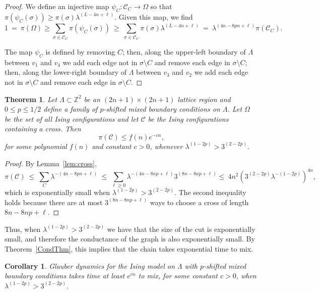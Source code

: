 \documentclass[letterpaper,english,numberwithinsect]{amsart}
\newtheorem{theorem}{Theorem}
\newtheorem{corollary}{Corollary}[section]
\newcommand{\cC}{\mathcal{C}}
\begin{document}
\begin{proof}  
We define an injective map $\psi_C: \cC_C \rightarrow \Omega$ so that
$\pi(\psi_C(\sigma)) \geq \pi(\sigma) \lambda^{(L-4n+\ell)}$.
Given this  map, we find
$$
1 \ =\ \pi(\Omega)  \geq  \sum_{\sigma\in\cC_C } \pi(\psi_C(\sigma))
\ \geq \  \sum_{\sigma\in\cC_C } \pi(\sigma) \lambda^{(L-4n +\ell)} 
\ = \ \lambda^{(4n-8pn+\ell)} \pi(\cC_C ).
$$

\noindent The map $\psi_C$ is defined by removing $C$; 
then, along the upper-left boundary of $\Lambda$ between $v_1$ and $v_4$ we add each edge not in $\sigma \setminus C$ and remove each edge in $\sigma \setminus C$; then, along the lower-right boundary of $\Lambda$ between $v_3$ and $v_2$ we add each edge not in $\sigma \setminus C$ and remove each edge in $\sigma \setminus C$.
\end{proof}

\begin{theorem}\label{thm:peierls}
Let $\Lambda \subset {\mathbb{Z}}^2$ be an $(2n+1) \times (2n+1)$ lattice region and $0 \leq p \leq 1/2$ define a family of $p$-shifted mixed boundary conditions on $\Lambda$.  
Let  $\Omega$ be the set of all Ising configurations and let $\cC$ be the Ising configurations containing  a cross.  Then
$$\pi(\cC) \leq f(n) e^{-cn},$$
for some polynomial $f(n)$ and constant $c>0$, whenever $\lambda^{(1-2p)} > 3^{(2-2p)}.$
\end{theorem}

\begin{proof}  
By Lemma~\ref{lem:cross},
$$
\pi(\cC)
\ \leq \ \sum_C \lambda^{-(4n-8pn+\ell)} 
\  \leq \ \sum_{\ell \geq 0} \lambda^{-(4n-8np+\ell)} 3^{(8n-8np+ \ell)}
 \leq \ 4n^2 (3^{(2-2p)}\lambda^{-(1-2p)})^{4n},$$
which is exponentially small when $\lambda^{(1-2p)} > 3^{(2-2p)}.$
The second inequality holds because there are at most $3^{(8n-8np+ \ell)}$ ways to choose a cross of length 
$8n-8np+\ell$.
\end{proof}

\noindent Thus, when $\lambda^{(1-2p)} > 3^{(2-2p)}$ we have that the size of the cut is exponentially small, and therefore the conductance of the graph is also exponentially small.  By Theorem~\ref{CondThm}, this implies that the chain takes exponential time to mix.

\begin{corollary}
Glauber dynamics for the Ising model on $\Lambda$ with $p$-shifted mixed boundary conditions takes time at least $e^{cn}$ to mix, for some constant $c>0$, when $\lambda^{(1-2p)} > 3^{(2-2p)}.$
\end{corollary}
\end{document}
